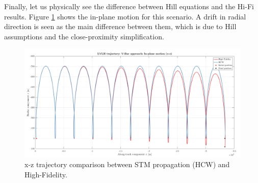 		\FloatBarrier
		\indent Finally, let us physically see the difference between Hill equations and the Hi-Fi results. Figure \ref{figCh2:LVLH_V_bar} shows the in-plane motion for this scenario. A drift in radial direction is seen as the main difference between them, which is due to Hill assumptions and the close-proximity simplification.
		\begin{figure}[!htb]
		\begin{changemargin}{-2.2cm}{-1cm}
		\begin{adjustbox}{width=1.2\textwidth}
		\centering\includegraphics[width = \linewidth]{Chapters/Chapter_02/LVLH_trajectory__V_Bar_approach_IP}
		\end{adjustbox}
		\end{changemargin}
		\caption{x-z trajectory comparison between STM propagation (HCW) and High-Fidelity.}
		\label{figCh2:LVLH_V_bar}
		\end{figure}
		\FloatBarrier

